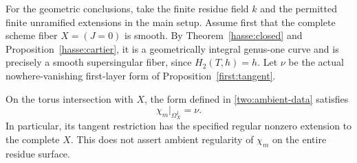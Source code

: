 For the geometric conclusions, take the finite residue field
$k$ and the permitted finite unramified extensions in the main
setup. Assume first that the complete scheme fiber
$X=(J=0)$ is smooth. By Theorem~\ref{hasse:closed} and
Proposition~\ref{hasse:cartier}, it is a geometrically integral genus-one
curve and is precisely a smooth supersingular fiber, since
$H_2(T,h)=h$. Let $\nu$ be the actual nowhere-vanishing
first-layer form of Proposition~\ref{first:tangent}.

\begin{lemma}
\label{two:tangent}
On the torus intersection with $X$, the form defined in
\eqref{two:ambient-data} satisfies
\begin{equation}
 \chi_m|_{\Omega_X^1}=\nu.
 \label{two:tangent-equation}
\end{equation}
In particular, its tangent restriction has the specified regular
nonzero extension to the complete $X$. This does not assert
ambient regularity of $\chi_m$ on the entire residue surface.
\end{lemma}

